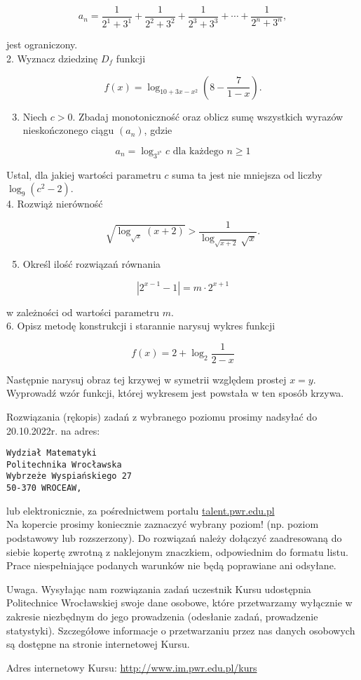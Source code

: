 \documentclass[10pt]{article}
\begin{document}
$$
a_{n}=\frac{1}{2^{1}+3^{1}}+\frac{1}{2^{2}+3^{2}}+\frac{1}{2^{3}+3^{3}}+\cdots+\frac{1}{2^{n}+3^{n}},
$$

jest ograniczony.\\
2. Wyznacz dziedzinę $D_{f}$ funkcji

$$
f(x)=\log _{10+3 x-x^{2}}\left(8-\frac{7}{1-x}\right) .
$$

\begin{enumerate}
  \setcounter{enumi}{2}
  \item Niech $c>0$. Zbadaj monotoniczność oraz oblicz sumę wszystkich wyrazów nieskończonego ciągu $\left(a_{n}\right)$, gdzie
\end{enumerate}

$$
a_{n}=\log _{3^{3^{n}}} c \text { dla każdego } n \geqslant 1
$$

Ustal, dla jakiej wartości parametru $c$ suma ta jest nie mniejsza od liczby $\log _{9}\left(c^{2}-2\right)$.\\
4. Rozwiąż nierówność

$$
\sqrt{\log _{\sqrt{x}}(x+2)}>\frac{1}{\log _{\sqrt{x+2}} \sqrt{x}} .
$$

\begin{enumerate}
  \setcounter{enumi}{4}
  \item Określ ilość rozwiązań równania
\end{enumerate}

$$
\left|2^{x-1}-1\right|=m \cdot 2^{x+1}
$$

w zależności od wartości parametru $m$.\\
6. Opisz metodę konstrukcji i starannie narysuj wykres funkcji

$$
f(x)=2+\log _{2} \frac{1}{2-x}
$$

Następnie narysuj obraz tej krzywej w symetrii względem prostej $x=y$. Wyprowadź wzór funkcji, której wykresem jest powstała w ten sposób krzywa.

Rozwiązania (rękopis) zadań z wybranego poziomu prosimy nadsyłać do 20.10.2022r. na adres:

\begin{verbatim}
Wydział Matematyki
Politechnika Wrocławska
Wybrzeże Wyspiańskiego 27
50-370 WROCEAW,
\end{verbatim}

lub elektronicznie, za pośrednictwem portalu \href{http://talent.pwr.edu.pl}{talent.pwr.edu.pl}\\
Na kopercie prosimy koniecznie zaznaczyć wybrany poziom! (np. poziom podstawowy lub rozszerzony). Do rozwiązań należy dołączyć zaadresowaną do siebie kopertę zwrotną z naklejonym znaczkiem, odpowiednim do formatu listu. Prace niespełniające podanych warunków nie będą poprawiane ani odsyłane.

Uwaga. Wysyłając nam rozwiązania zadań uczestnik Kursu udostępnia Politechnice Wrocławskiej swoje dane osobowe, które przetwarzamy wyłącznie w zakresie niezbędnym do jego prowadzenia (odesłanie zadań, prowadzenie statystyki). Szczegółowe informacje o przetwarzaniu przez nas danych osobowych są dostępne na stronie internetowej Kursu.

Adres internetowy Kursu: \href{http://www.im.pwr.edu.pl/kurs}{http://www.im.pwr.edu.pl/kurs}
\end{document}
